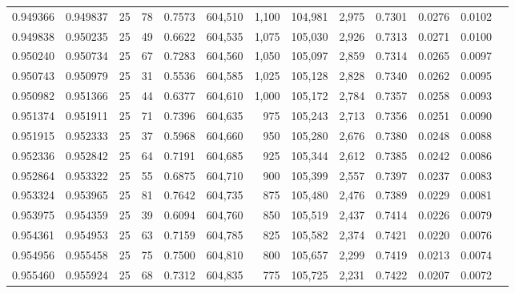 \begin{tabular}{rrrrrrrrrrrrr}
0.949366 & 0.949837 &    25 &  78 &                                     0.7573 & 604,510 &   1,100 & 104,981 &   2,975 & 0.7301 & 0.0276 & 0.0102 \\
0.949838 & 0.950235 &    25 &  49 &                                     0.6622 & 604,535 &   1,075 & 105,030 &   2,926 & 0.7313 & 0.0271 & 0.0100 \\
0.950240 & 0.950734 &    25 &  67 &                                     0.7283 & 604,560 &   1,050 & 105,097 &   2,859 & 0.7314 & 0.0265 & 0.0097 \\
0.950743 & 0.950979 &    25 &  31 &                                     0.5536 & 604,585 &   1,025 & 105,128 &   2,828 & 0.7340 & 0.0262 & 0.0095 \\
0.950982 & 0.951366 &    25 &  44 &                                     0.6377 & 604,610 &   1,000 & 105,172 &   2,784 & 0.7357 & 0.0258 & 0.0093 \\
0.951374 & 0.951911 &    25 &  71 &                                     0.7396 & 604,635 &     975 & 105,243 &   2,713 & 0.7356 & 0.0251 & 0.0090 \\
0.951915 & 0.952333 &    25 &  37 &                                     0.5968 & 604,660 &     950 & 105,280 &   2,676 & 0.7380 & 0.0248 & 0.0088 \\
0.952336 & 0.952842 &    25 &  64 &                                     0.7191 & 604,685 &     925 & 105,344 &   2,612 & 0.7385 & 0.0242 & 0.0086 \\
0.952864 & 0.953322 &    25 &  55 &                                     0.6875 & 604,710 &     900 & 105,399 &   2,557 & 0.7397 & 0.0237 & 0.0083 \\
0.953324 & 0.953965 &    25 &  81 &                                     0.7642 & 604,735 &     875 & 105,480 &   2,476 & 0.7389 & 0.0229 & 0.0081 \\
0.953975 & 0.954359 &    25 &  39 &                                     0.6094 & 604,760 &     850 & 105,519 &   2,437 & 0.7414 & 0.0226 & 0.0079 \\
0.954361 & 0.954953 &    25 &  63 &                                     0.7159 & 604,785 &     825 & 105,582 &   2,374 & 0.7421 & 0.0220 & 0.0076 \\
0.954956 & 0.955458 &    25 &  75 &                                     0.7500 & 604,810 &     800 & 105,657 &   2,299 & 0.7419 & 0.0213 & 0.0074 \\
0.955460 & 0.955924 &    25 &  68 &                                     0.7312 & 604,835 &     775 & 105,725 &   2,231 & 0.7422 & 0.0207 & 0.0072 \\

\end{tabular}
